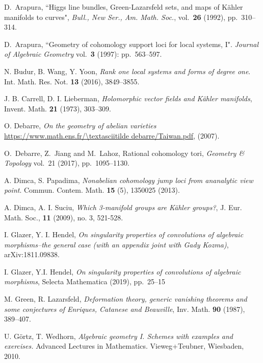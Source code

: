 \documentclass[12pt,reqno]{amsart}
\theoremstyle{question}
\theoremstyle{definition}
\theoremstyle{remark}
\theoremstyle{cited}
\theoremstyle{citeddef}
\begin{document}
%
%


\begin{thebibliography}{ADMSP}

 D.\ Arapura, ``Higgs line bundles, Green-Lazarsfeld sets, and maps of K\"ahler manifolds to curves", \textit{Bull., New Ser.,
Am. Math. Soc.}, vol.\ \textbf{26} (1992), pp.\ 310--314.

 D.\ Arapura, ``Geometry of cohomology support loci for local systems, I". \textit{Journal of Algebraic Geometry} vol.\ \textbf{3} (1997): pp.\ 563--597.


 N. Budur, B. Wang, Y. Yoon, \textit{Rank one local systems and forms of degree one}. Int. Math. Res. Not. \textbf{13} (2016), 3849--3855.



 J. B. Carrell, D. I. Lieberman,  \textit{Holomorphic vector fields and K\"ahler manifolds}, Invent. Math. \textbf{21} (1973), 303--309.

 O. Debarre,  \textit{On the geometry of abelian varieties} \url{https://www.math.ens.fr/\textasciitilde debarre/Taiwan.pdf}, (2007).

 O.\ Debarre, Z.\ Jiang and M.\ Lahoz, Rational cohomology tori, \textit{Geometry \& Topology} vol.\ 21 (2017),
pp.\ 1095--1130.

A. Dimca, S. Papadima, \textit{Nonabelian cohomology jump loci from ananalytic view point}. Commun. Contem. Math. \textbf{15} (5), 1350025 (2013).


 A. Dimca, A. I. Suciu, \textit{Which 3-manifold groups are K\"ahler groups?}, J. Eur. Math. Soc., \textbf{11} (2009), no. 3, 521-528.

 I. Glazer, Y. I. Hendel, \textit{On singularity properties of convolutions of algebraic morphisms--the general case (with an appendix joint with Gady Kozma)}, arXiv:1811.09838.

  I. Glazer, Y.I. Hendel, \textit{On singularity properties of convolutions of algebraic morphisms}, Selecta Mathematica (2019), pp.\ 25--15


 M. Green, R. Lazarsfeld, \textit{Deformation theory, generic vanishing theorems and some conjectures of Enriques, Catanese and Beauville}, Inv. Math. \textbf{90} (1987), 389--407.

 U. G\"ortz, T. Wedhorn, \textit{Algebraic geometry I. Schemes with examples and exercises.} Advanced Lectures in Mathematics. Vieweg+Teubner, Wiesbaden, 2010. 


\end{thebibliography}
\end{document}
